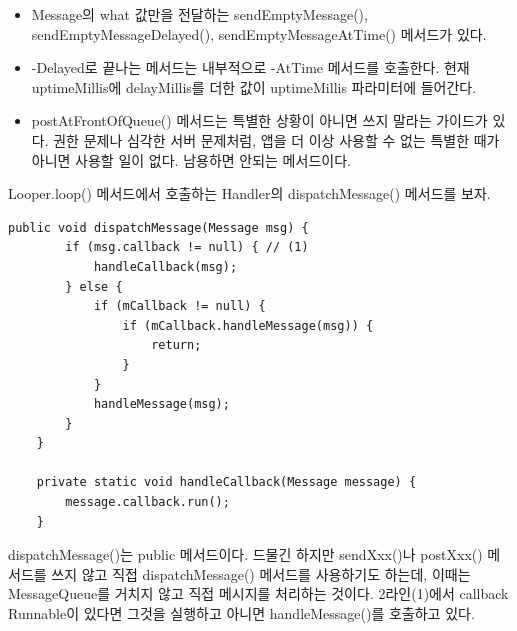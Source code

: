 \begin{itemize}
\item Message의 what 값만을 전달하는 sendEmptyMessage(), sendEmptyMessageDelayed(), sendEmptyMessageAtTime() 메서드가 있다.
\item -Delayed로 끝나는 메서드는 내부적으로 -AtTime 메서드를 호출한다. 현재 uptimeMillis에 delayMillis를 더한 값이 uptimeMillis 파라미터에 들어간다.
\item postAtFrontOfQueue() 메서드는 특별한 상황이 아니면 쓰지 말라는 가이드가 있다. 
권한 문제나 심각한 서버 문제처럼, 앱을 더 이상 사용할 수 없는 특별한 때가 아니면 사용할 일이 없다. 남용하면 안되는 메서드이다.
\end{itemize}

Looper.loop() 메서드에서 호출하는 Handler의 dispatchMessage() 메서드를 보자.
\begin{lstlisting}[frame=single, caption=Handler.java] 
	public void dispatchMessage(Message msg) {
		if (msg.callback != null) { // (1)
			handleCallback(msg);
		} else {
			if (mCallback != null) {
				if (mCallback.handleMessage(msg)) {
					return;
				}
			}
			handleMessage(msg);
		}
	}
	
	private static void handleCallback(Message message) {
		message.callback.run();
	}
\end{lstlisting}
dispatchMessage()는 public 메서드이다. 
드물긴 하지만 sendXxx()나 postXxx() 메서드를 쓰지 않고 직접 dispatchMessage() 메서드를 사용하기도 하는데, 이때는 MessageQueue를 거치지 않고 직접 메시지를 처리하는 것이다.
2라인(1)에서 callback Runnable이 있다면 그것을 실행하고 아니면 handleMessage()를 호출하고 있다.

